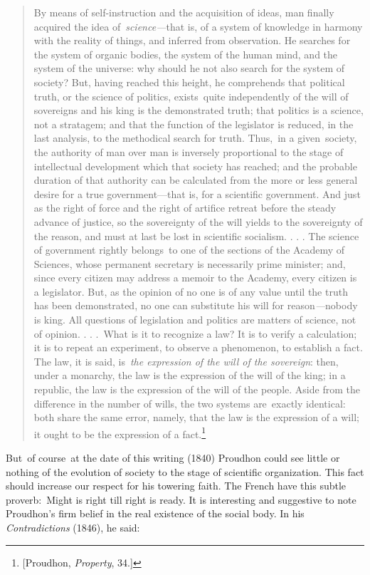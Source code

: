 \documentclass[twoside,symmetric,nobib,justified]{tufte-book}
\begin{document}
\begin{quote}
By means of self-instruction and the acquisition of ideas, man finally
acquired the idea of~\emph{science---}that is, of a system of knowledge
in harmony with the reality of things, and inferred from observation. He
searches for the system of organic bodies, the system of the human mind,
and the system of the universe: why should he not also search for the
system of society? But, having reached this height, he comprehends that
political truth, or the science of politics, exists~quite independently
of the will of sovereigns and his king is the demonstrated truth; that
politics is a science, not a stratagem; and that the function of the
legislator is reduced, in the last analysis, to the methodical search
for truth. Thus,~in a given~society, the authority of man over man is
inversely proportional to the stage of intellectual development which
that society has reached; and the probable duration of that authority
can be calculated from the more or less general desire for a true
government---that is, for a scientific government. And just as the right
of force and the right of artifice retreat before the steady advance of
justice, so the sovereignty of the will yields to the sovereignty of the
reason, and must at last be lost in scientific socialism. . . . The
science of government rightly belongs~to one of the sections of the
Academy of Sciences, whose permanent secretary is necessarily prime
minister; and, since every citizen may address a memoir to the Academy,
every citizen is a legislator. But, as the opinion of no one is of any
value until the truth has been demonstrated, no one can substitute his
will for reason\emph{---}nobody is king. All questions of legislation
and politics are matters of science, not of opinion. . . .~What is it to
recognize a law? It is to verify a calculation; it is to repeat an
experiment, to observe a phenomenon, to establish a fact. The law, it is
said, is~\emph{the expression of the will of the sovereign}: then, under
a monarchy, the law is the expression of the will of the king; in a
republic, the law is the expression of the will of the people. Aside
from the difference in the number of wills, the two systems are~exactly
identical: both share the same error, namely, that the law is the
expression of a will; it ought to be the expression of a
fact.\footnote{{[}Proudhon, \emph{Property}, 34.{]}}~~
\end{quote}

But~of course~at the date of this writing (1840) Proudhon could see
little or nothing of the evolution of society to the stage of scientific
organization. This fact should increase our respect for his towering
faith. The French have this subtle proverb:~Might is right till right is
ready. It is interesting and suggestive to note Proudhon's firm belief
in the real existence of the social body. In his \emph{Contradictions
}(1846), he said:~
\end{document}
